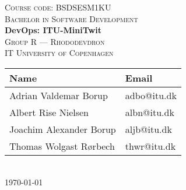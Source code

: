 \newcommand{\HRule}{\rule{1.25\linewidth}{0.5mm}}
\center
\vspace*{-4.3cm}
%
\vspace{3cm}
\textsc{\large Course code: BSDSESM1KU}
\\[0.2cm]
\textsc{\large Bachelor in Software Development}
\\[0.5cm]
\hbox{\makebox[1\textwidth][c]{\HRule}}
\vspace{0.4cm}
{ \huge \bfseries DevOps: ITU-MiniTwit}
\\[0.6cm]
\hbox{\makebox[1\textwidth][c]{\HRule}}
\vspace{0.9cm}
\textsc{\Large Group R --- Rhododevdron\\[0.5cm]IT University of Copenhagen}\\[1.5cm]
\begin{tabular}{ll}
\toprule
\textbf{Name} & \textbf{Email} \\
\midrule
Adrian Valdemar Borup & adbo@itu.dk \\
Albert Rise Nielsen & albn@itu.dk \\
Joachim Alexander Borup & aljb@itu.dk \\
Thomas Wolgast Rørbech & thwr@itu.dk \\
\bottomrule
\end{tabular}
\\[2cm]
{\large \today}
\vfill
